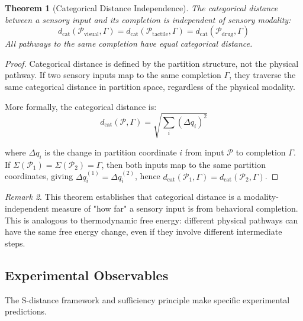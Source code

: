 \documentclass[aps,prd,twocolumn,superscriptaddress,floatfix,nofootinbib]{revtex4-2}
\newtheorem{theorem}{Theorem}[section]
\theoremstyle{remark}
\newtheorem{remark}[theorem]{Remark}
\begin{document}
\begin{theorem}[Categorical Distance Independence]
\label{thm:categorical_distance_indep}
The categorical distance between a sensory input and its completion is independent of sensory modality:
\begin{equation}
d_{\text{cat}}(\mathcal{P}_{\text{visual}}, \Gamma) = d_{\text{cat}}(\mathcal{P}_{\text{tactile}}, \Gamma) = d_{\text{cat}}(\mathcal{P}_{\text{drug}}, \Gamma)
\end{equation}
All pathways to the same completion have equal categorical distance.
\end{theorem}

\begin{proof}
Categorical distance is defined by the partition structure, not the physical pathway. If two sensory inputs map to the same completion $\Gamma$, they traverse the same categorical distance in partition space, regardless of the physical modality.

More formally, the categorical distance is:
$$
d_{\text{cat}}(\mathcal{P}, \Gamma) = \sqrt{\sum_i (\Delta q_i)^2}
$$

where $\Delta q_i$ is the change in partition coordinate $i$ from input $\mathcal{P}$ to completion $\Gamma$. If $\Sigma(\mathcal{P}_1) = \Sigma(\mathcal{P}_2) = \Gamma$, then both inputs map to the same partition coordinates, giving $\Delta q_i^{(1)} = \Delta q_i^{(2)}$, hence $d_{\text{cat}}(\mathcal{P}_1, \Gamma) = d_{\text{cat}}(\mathcal{P}_2, \Gamma)$.
\end{proof}

\begin{remark}
This theorem establishes that categorical distance is a modality-independent measure of "how far" a sensory input is from behavioral completion. This is analogous to thermodynamic free energy: different physical pathways can have the same free energy change, even if they involve different intermediate steps.
\end{remark}

\subsection{Experimental Observables}

The S-distance framework and sufficiency principle make specific experimental predictions.
\end{document}
